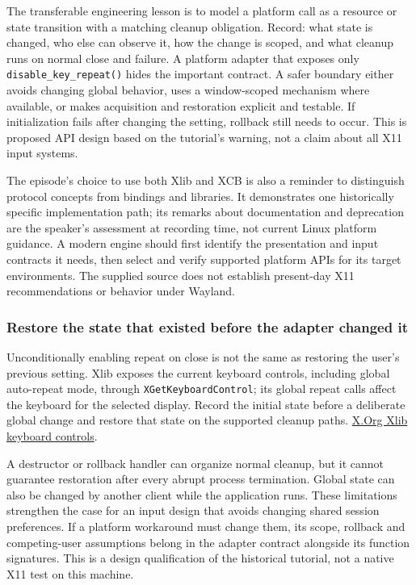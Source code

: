 The transferable engineering lesson is to model a platform call as a resource or state transition with a matching cleanup obligation. Record: what state is changed, who else can observe it, how the change is scoped, and what cleanup runs on normal close and failure. A platform adapter that exposes only \texttt{disable\_key\_repeat()} hides the important contract. A safer boundary either avoids changing global behavior, uses a window-scoped mechanism where available, or makes acquisition and restoration explicit and testable. If initialization fails after changing the setting, rollback still needs to occur. This is proposed API design based on the tutorial's warning, not a claim about all X11 input systems.

The episode's choice to use both Xlib and XCB is also a reminder to distinguish protocol concepts from bindings and libraries. It demonstrates one historically specific implementation path; its remarks about documentation and deprecation are the speaker's assessment at recording time, not current Linux platform guidance. A modern engine should first identify the presentation and input contracts it needs, then select and verify supported platform APIs for its target environments. The supplied source does not establish present-day X11 recommendations or behavior under Wayland.

\subsubsection{Restore the state that existed before the adapter changed it}\label{restore-the-state-that-existed-before-the-adapter-changed-it}

Unconditionally enabling repeat on close is not the same as restoring the user's previous setting. Xlib exposes the current keyboard controls, including global auto-repeat mode, through \texttt{XGetKeyboardControl}; its global repeat calls affect the keyboard for the selected display. Record the initial state before a deliberate global change and restore that state on the supported cleanup paths. \href{https://www.x.org/releases/X11R7.6/doc/libX11/specs/libX11/libX11.html}{X.Org Xlib keyboard controls}.

A destructor or rollback handler can organize normal cleanup, but it cannot guarantee restoration after every abrupt process termination. Global state can also be changed by another client while the application runs. These limitations strengthen the case for an input design that avoids changing shared session preferences. If a platform workaround must change them, its scope, rollback and competing-user assumptions belong in the adapter contract alongside its function signatures. This is a design qualification of the historical tutorial, not a native X11 test on this machine.

